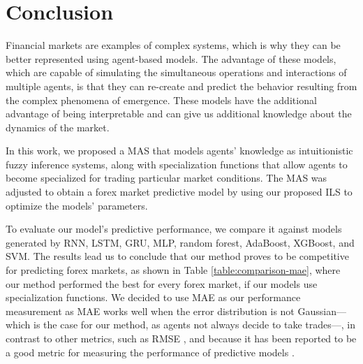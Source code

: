 \documentclass{ieeeaccess}
\begin{document}
\section{Conclusion}
\label{section:conclusion}


Financial markets are examples of complex systems, which is why they
can be better represented using agent-based models. The advantage of these models, which are capable of simulating the
simultaneous operations and interactions of multiple agents, is that they can
re-create and predict the behavior resulting from the complex phenomena of
emergence. These models have the additional advantage of being interpretable and
can give us additional knowledge about the dynamics of the market.

In this work, we proposed a MAS that models agents' knowledge as
intuitionistic fuzzy inference systems, along with specialization
functions that allow agents to become specialized for trading
particular market conditions. The MAS was adjusted to obtain a forex
market predictive model by using our proposed ILS to optimize the
models' parameters.

To evaluate our model's predictive performance, we compare it against
models generated by RNN, LSTM, GRU, MLP, random forest, AdaBoost,
XGBoost, and SVM. The results lead us to conclude that our method
proves to be competitive for predicting forex markets, as shown in
Table \ref{table:comparison-mae}, where our method performed the best
for every forex market, if our models use specialization functions. We
decided to use MAE as our performance measurement as MAE works well
when the error distribution is not Gaussian---which is the case for
our method, as agents not always decide to take trades---, in contrast
to other metrics, such as RMSE \cite{chai2014root}, and because it has
been reported to be a good metric for measuring the performance of
predictive models \cite{willmott2005advantages}
\cite{willmott2009ambiguities}.
\end{document}
